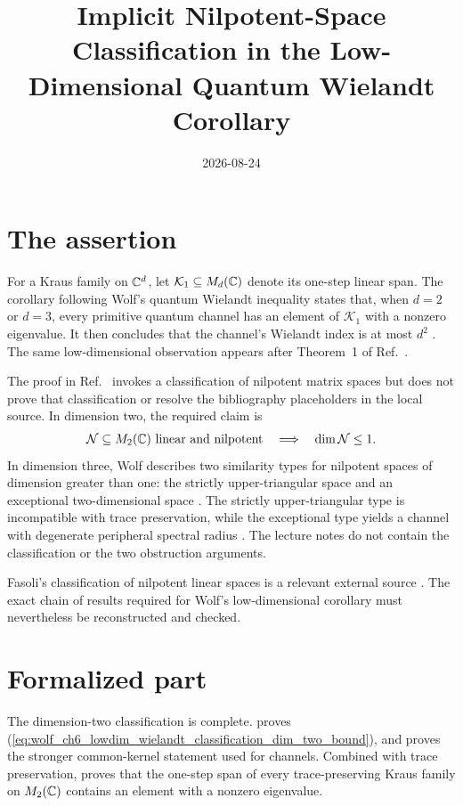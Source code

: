 \documentclass[11pt]{article}
\title{Implicit Nilpotent-Space Classification in the Low-Dimensional Quantum Wielandt Corollary}
\author{}
\date{2026-08-24}
\begin{document}
\maketitle
{}

\section{The assertion}

For a Kraus family on $\mathbb{C}^d$, let $\mathcal K_1\subseteq M_{d}(\mathbb{C})$ denote its
one-step linear span. The corollary following Wolf's quantum Wielandt
inequality states that, when $d=2$ or $d=3$, every primitive quantum channel
has an element of $\mathcal K_1$ with a nonzero eigenvalue. It then concludes
that the channel's Wielandt index is at most $d^2$
\cite[Chapter~6, lines~1110--1126]{Wolf2012Quantum}. The same
low-dimensional observation appears after Theorem~1 of
Ref.~\cite{Sanz2010Quantum}.

The proof in Ref.~\cite{Wolf2012Quantum} invokes a classification of
nilpotent matrix spaces but does not prove that classification or resolve the
bibliography placeholders in the local source. In dimension two, the required
claim is
\begin{align}
    \mathcal N\subseteq M_{2}(\mathbb{C})\text{ linear and nilpotent}
        \quad\Longrightarrow\quad
        \dim\mathcal N\leq1.
    \label{eq:wolf_ch6_lowdim_wielandt_classification_dim_two_bound}
\end{align}
In dimension three, Wolf describes two similarity types for nilpotent spaces
of dimension greater than one: the strictly upper-triangular space and an
exceptional two-dimensional space \cite[Chapter~6]{Wolf2012Quantum}. The
strictly upper-triangular type is incompatible with trace preservation, while
the exceptional type yields a channel with degenerate peripheral spectral
radius \cite[Chapter~6]{Wolf2012Quantum}. The lecture notes do not contain the
classification or the two obstruction arguments.

Fasoli's classification of nilpotent linear spaces is a relevant external
source \cite{Fasoli1997Classification}. The exact chain of results required
for Wolf's low-dimensional corollary must nevertheless be reconstructed and
checked.

\section{Formalized part}

The dimension-two classification is complete.
proves
(\ref{eq:wolf_ch6_lowdim_wielandt_classification_dim_two_bound}), and
proves the stronger common-kernel statement used for channels. Combined with
trace preservation,
proves that the one-step span of every trace-preserving Kraus family on
$M_{2}(\mathbb{C})$ contains an element with a nonzero eigenvalue.
\end{document}
